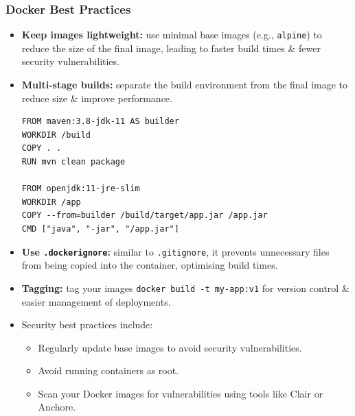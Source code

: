 \documentclass[a4paper,11pt]{article}
\begin{document}
\subsubsection{Docker Best Practices}
\begin{itemize}
    \item   \textbf{Keep images lightweight:} use minimal base images (e.g., \verb|alpine|) to reduce the size of 
            the final image, leading to faster build times \& fewer security vulnerabilities.
    \item   \textbf{Multi-stage builds:} separate the build environment from the final image to reduce size \&
            improve performance.
            \begin{verbatim}
FROM maven:3.8-jdk-11 AS builder
WORKDIR /build
COPY . .
RUN mvn clean package

FROM openjdk:11-jre-slim
WORKDIR /app
COPY --from=builder /build/target/app.jar /app.jar
CMD ["java", "-jar", "/app.jar"]
            \end{verbatim}

    \item   \textbf{Use \texttt{.dockerignore}:} similar to \verb|.gitignore|, it prevents unnecessary files from
            being copied into the container, optimising build times.

    \item   \textbf{Tagging:} tag your images \texttt{docker build -t my-app:v1} for version control \&
            easier management of deployments.

    \item   Security best practices include:
            \begin{itemize}
                \item   Regularly update base images to avoid security vulnerabilities.
                \item   Avoid running containers as root.
                \item   Scan your Docker images for vulnerabilities using tools like Clair or Anchore.
            \end{itemize}
\end{itemize}
\end{document}
